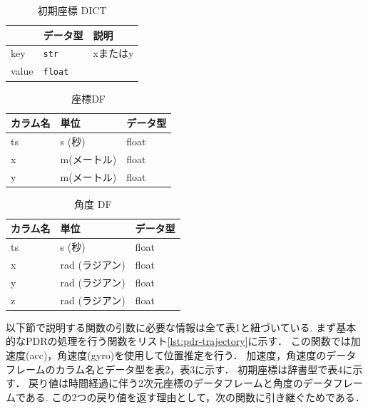 \documentclass[Japanese]{dicomopapers}
\begin{document}
\begin{table}[ht]
	\centering
	\label{tab:map_dict}
	\begin{tabular}{lll}
		\hline
		      & {データ型}         & {説明}            \\ \hline
		key   & \texttt{str}   & xまたはy           \\ \hline
		value & \texttt{float} & \makecell{初期座標} \\ \hline
	\end{tabular}
	\caption{初期座標 DICT}
\end{table}




\begin{table}[h]
	\centering
	\begin{tabular}{lll}
		\toprule
		カラム名 & 単位      & データ型  \\
		\midrule
		ts   & s (秒)   & float \\
		x    & m(メートル) & float \\
		y    & m(メートル) & float \\
		\bottomrule
	\end{tabular}
	\caption{座標DF}
\end{table}


\begin{table}[h]
	\centering
	\begin{tabular}{lll}
		\toprule
		カラム名 & 単位         & データ型  \\
		\midrule
		ts   & s (秒)      & float \\
		x    & rad (ラジアン) & float \\
		y    & rad (ラジアン) & float \\
		z    & rad (ラジアン) & float \\
		\bottomrule
	\end{tabular}
	\caption{角度 DF}
\end{table}

以下節で説明する関数の引数に必要な情報は全て表1と紐づいている.
まず基本的なPDRの処理を行う関数をリスト\ref{lst:pdr-trajectory}に示す．
この関数では加速度(acc)，角速度(gyro)を使用して位置推定を行う．
加速度，角速度のデータフレームのカラム名とデータ型を表2，表3に示す．
初期座標は辞書型で表4に示す．
戻り値は時間経過に伴う2次元座標のデータフレームと角度のデータフレームである.
この2つの戻り値を返す理由として，次の関数に引き継ぐためである．
\end{document}

